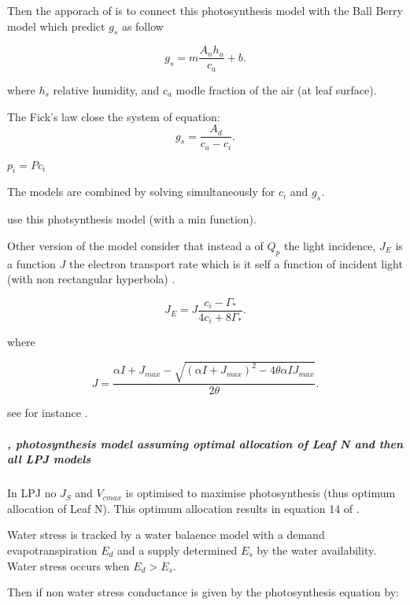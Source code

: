 \documentclass[a4paper,11pt]{article}
\begin{document}
Then the apporach of \citet{Collatz-1991} is to connect this photosynthesis model with the Ball Berry model which predict $g_s$  as follow

\begin{equation}
\label{eq:gs}
g_s= m \frac{A_n h_a}{c_a}+b.
\end{equation}

where $h_s$ relative humidity, and $c_a$ modle fraction of the air (at leaf surface).

The Fick's law close the system of equation:
\begin{equation}
\label{eq:fick}
g_s=\frac{A_d}{c_a - c_i}.
\end{equation}

$p_i = P c_i$

The models are combined by solving simultaneously for $c_i$ and $g_s$.

\citet{Scheiter-2009} use this photsynthesis model (with a min function).

Other version of the model consider that instead a of $Q_p$ the light incidence, $J_E$ is a function $J$ the electron transport rate which is it self a function of incident light (with non rectangular hyperbola) \citep{Sharkey-2007}.

\begin{equation}
\label{eq:JCb}
J_E = J \frac{ c_i - \Gamma_*}{4c_i + 8 \Gamma_*}.
\end{equation}

where

\begin{equation}
\label{eq:Jlight}
J = \frac{ \alpha I + J_{max} - \sqrt{(\alpha I + J_{max})^2 - 4 \theta \alpha I J_{max}}}{2\theta}.
\end{equation}

see for instance \citet{Bernacchi-2009}.


\subparagraph{\citet{Haxeltine-1996}, photosynthesis model assuming optimal allocation of Leaf N and then all LPJ models}

In LPJ no $J_S$ and $V_{cmax}$ is optimised to maximise photosynthesis (thus optimum allocation of Leaf N). This optimum allocation results in equation 14 of \citet{Sitch-2008}.

Water stress is tracked by a water balaence model with a demand evapotranspiration $E_d$ and a supply determined $E_s$ by the water availability. Water stress occurs when $E_d > E_s$.

Then if non water stress conductance is given by the photosynthesis equation by:
\end{document}
